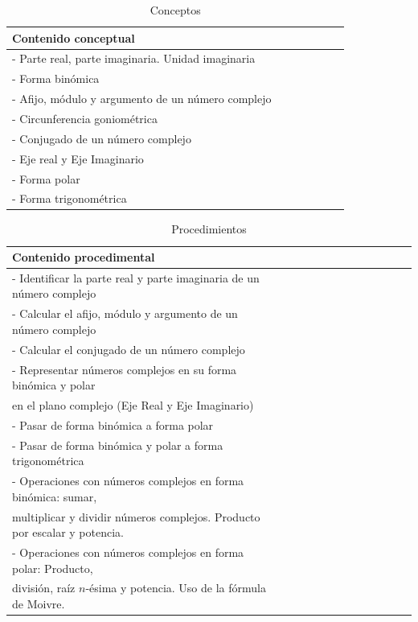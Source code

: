 \documentclass[../main.tex]{memoir}
\begin{document}
\begin{table}[H]
	\centering
	\begin{tabular}{lcccccc}
		\toprule
		\hspace{2.5cm}Contenido conceptual \\
		\midrule
		- Parte real, parte imaginaria. Unidad imaginaria \\
		- Forma binómica \\
		- Afijo, módulo y argumento de un número complejo \\
		- Circunferencia goniométrica \\
		- Conjugado de un número complejo \\
		- Eje real y Eje Imaginario \\
		- Forma polar \\
		- Forma trigonométrica\\
		\bottomrule
	\end{tabular}
	\caption{Conceptos}
	\label{tab:conceptos}
\end{table}


\begin{table}[H]
	\centering
	\begin{tabular}{lcccccccccccc}
		\toprule
		\hspace{4cm}Contenido procedimental \\
		\midrule
		- Identificar la parte real y parte imaginaria de un número complejo \\
		- Calcular el afijo, módulo y argumento de un número complejo \\
		- Calcular el conjugado de un número complejo \\
		- Representar números complejos en su forma binómica y polar\\
		\hspace{0.2cm} en el plano complejo (Eje Real y Eje Imaginario) \\
		- Pasar de forma binómica a forma polar \\
		- Pasar de forma binómica y polar a forma trigonométrica\\
		- Operaciones con números complejos en forma binómica: sumar, \\ \hspace{0.2cm}multiplicar y dividir números complejos. Producto por escalar y potencia. \\
		- Operaciones con números complejos en forma polar: Producto, \\
		\hspace{0.2cm}división, raíz $n$-ésima y potencia. Uso de la fórmula de Moivre.\\
		\bottomrule
	\end{tabular}
	\caption{Procedimientos}
	\label{tab:procedimientos}
\end{table}
\end{document}
